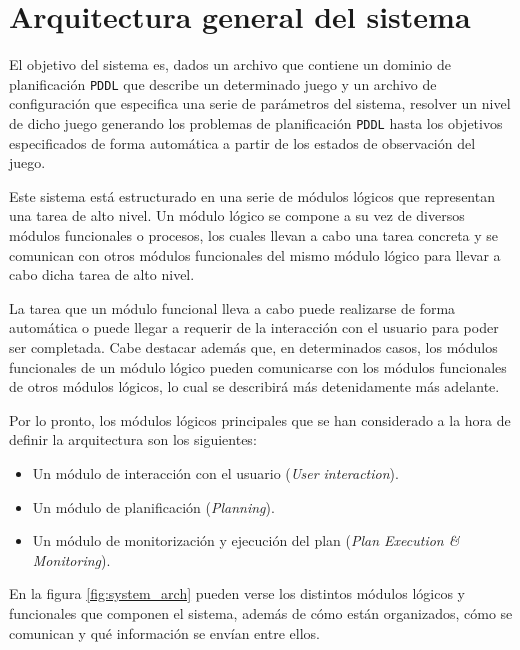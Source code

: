 
\chapter{Arquitectura general del sistema}
\label{chap:arch}

El objetivo del sistema es, dados un archivo que contiene un dominio de planificación \texttt{PDDL}
que describe un determinado juego y un archivo de configuración que especifica una serie de parámetros
del sistema, resolver un nivel de dicho juego generando los problemas de planificación
\texttt{PDDL} hasta los objetivos especificados de forma automática a partir de los estados de observación
del juego.

Este sistema está estructurado en una serie de módulos lógicos que representan una
tarea de alto nivel. Un módulo lógico se compone a su vez de diversos módulos
funcionales o procesos, los cuales llevan a cabo una tarea concreta y se comunican con
otros módulos funcionales del mismo módulo lógico para llevar a cabo dicha tarea de alto
nivel.

La tarea que un módulo funcional lleva a cabo puede realizarse de forma automática o
puede llegar a requerir de la interacción con el usuario para poder ser completada.
Cabe destacar además que, en determinados casos, los módulos funcionales de un módulo
lógico pueden comunicarse con los módulos funcionales de otros módulos lógicos, lo cual se
describirá más detenidamente más adelante.

Por lo pronto, los módulos lógicos principales que se han considerado a la hora de definir
la arquitectura son los siguientes:

\begin{itemize}[label=\textbullet]
    \item Un módulo de interacción con el usuario (\textit{User interaction}).
    \item Un módulo de planificación (\textit{Planning}).
    \item Un módulo de monitorización y ejecución del plan (\textit{Plan Execution \& Monitoring}).
\end{itemize}

En la figura \ref{fig:system_arch} pueden verse los distintos módulos lógicos y funcionales que
componen el sistema, además de cómo están organizados, cómo se comunican y qué información se
envían entre ellos.

